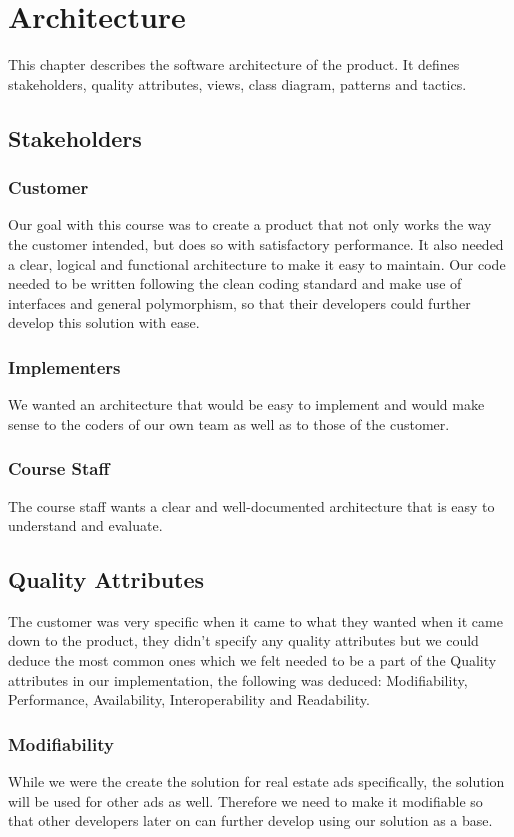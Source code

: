 \chapter{Architecture}
\label{Architecture}
This chapter describes the software architecture of the product. It defines stakeholders, quality attributes, views, class diagram, patterns and tactics.
\newpage

\section{Stakeholders}

\subsection{Customer}
Our goal with this course was to create a product that not only works the way the customer intended, but does so with satisfactory performance. It also needed a clear, logical and functional architecture to make it easy to maintain. 
Our code needed to be written following the clean coding standard and make use of interfaces and general polymorphism, so that their developers could further develop this solution with ease.

\subsection{Implementers}
We wanted an architecture that would be easy to implement and would make sense to the coders of our own team as well as to those of the customer.

\subsection{Course Staff}
The course staff wants a clear and well-documented architecture that is easy to understand and evaluate.


\section{Quality Attributes}
The customer was very specific when it came to what they wanted when it came down to the product, they didn't specify any quality attributes but we could deduce the most common ones which we felt needed to be a part of the Quality attributes in our implementation, the following was deduced: Modifiability, Performance, Availability, Interoperability and Readability. 

\subsection{Modifiability}
While we were the create the solution for real estate ads specifically, the solution will be used for other ads as well. Therefore we need to make it modifiable so that other developers later on can further develop using our solution as a base.

